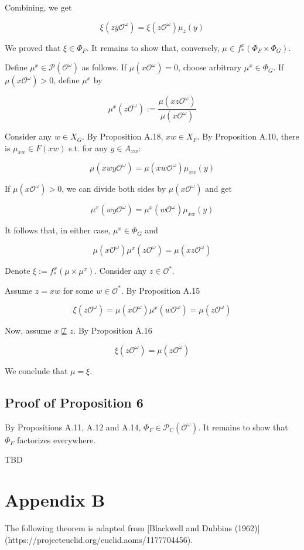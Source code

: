 \documentclass[a4paper]{article}
\newcommand{\Prob}{\mathcal{P}}
\newcommand{\Obs}{\mathcal{O}}
\newcommand{\ObsO}{\Obs^\omega}
\newcommand{\CC}{\mathcal{P}_{\operatorname{C}}}
\begin{document}
Combining, we get

$$\xi(zy\ObsO) = \xi(z\ObsO) \mu_z(y)$$

We proved that ${\xi \in \Phi_F}$. It remains to show that, conversely, ${\mu \in f_*^x(\Phi_F \times \Phi_G)}$. 

Define ${\mu^x \in \Prob(\ObsO)}$ as follows. If ${\mu(x\ObsO)=0}$, choose arbitrary ${\mu^x \in \Phi_G}$. If ${\mu(x\ObsO) > 0}$, define ${\mu^x}$ by 

$${\mu^x(z\ObsO):=\frac{\mu(xz\ObsO)}{\mu(x\ObsO)}}$$

Consider any ${w \in X_G}$. By Proposition A.18, ${xw \in X_F}$. By Proposition A.10, there is ${\mu_{xw} \in F(xw)}$ s.t. for any ${y \in A_{xw}}$:

$$\mu(xwy\ObsO)=\mu(xw\ObsO)\mu_{xw}(y)$$

If ${\mu(x\ObsO) > 0}$, we can divide both sides by $\mu(x\ObsO)$ and get

$$\mu^x(wy\ObsO)=\mu^x(w\ObsO)\mu_{xw}(y)$$

It follows that, in either case, ${\mu^x \in \Phi_G}$ and 

$$\mu(x\ObsO)\mu^x(z\ObsO)=\mu(xz\ObsO)$$

Denote ${\xi := f^x_*(\mu \times \mu^x)}$. Consider any ${z \in \Obs^*}$.

Assume ${z = xw}$ for some ${w \in \Obs^*}$. By Proposition A.15

$$\xi(z\ObsO) = \mu(x\ObsO)\mu^x(w\ObsO)=\mu(z\ObsO)$$

Now, assume ${x \not\sqsubseteq z}$. By Proposition A.16

$$\xi(z\ObsO) = \mu(z\ObsO)$$

We conclude that ${\mu = \xi}$.

\subsection{Proof of Proposition 6}

By Propositions A.11, A.12 and A.14, ${\Phi_F \in \CC(\ObsO)}$. It remains to show that ${\Phi_F}$ factorizes everywhere.

TBD

\section{Appendix B}

The following theorem is adapted from [Blackwell and Dubbins (1962)](https://projecteuclid.org/euclid.aoms/1177704456).
\end{document}
